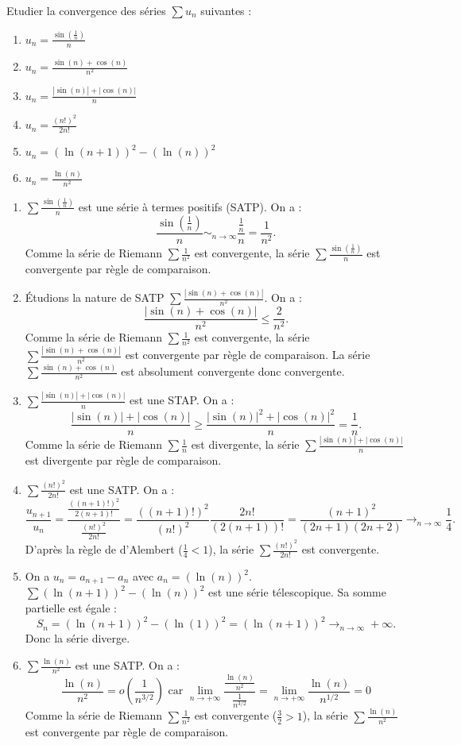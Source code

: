 \documentclass{book}
\begin{document}
\begin{Exercice}[ Nature]
Etudier la convergence des séries $\sum u_n$ suivantes :
    \begin{enumerate}
        \item $u_n =\frac{\sin(\frac 1 n)}{n}$ 
        \item $u_n=\frac{\sin(n)+\cos(n)}{n^2}$
        \item $u_n=\frac{|\sin(n)|+|\cos(n)|}{n}$
        \item $u_n=\frac{(n!)^2}{2n!}$
        \item $u_n=(\ln(n+1))^2-(\ln(n))^2$
        \item $u_n=\frac{\ln(n)}{n^2}$
    \end{enumerate}
\begin{Correction}
    \begin{enumerate}
        \item $\sum \frac{\sin(\frac 1 n)}{n}$ est une série à termes positifs (SATP). On a :
$$\frac{\sin(\frac 1 n)}{n}\sim_{n\to\infty}\frac{\frac 1 n}{n}=\frac{1}{n^2}.$$
Comme la série de Riemann $\sum \frac{1}{n^2}$ est convergente, la série $\sum \frac{\sin(\frac 1 n)}{n}$ est convergente par règle de comparaison.
	   \item 	Étudions la nature de SATP $\sum \frac{|\sin(n)+\cos(n)|}{n^2}$. On a :
	   $$\frac{|\sin(n)+\cos(n)|}{n^2} \leq \frac{2}{n^2}.$$
	   Comme la série de Riemann $\sum \frac{1}{n^2}$ est convergente, la série $\sum \frac{|\sin(n)+\cos(n)|}{n^2}$ est convergente par règle de comparaison. La série 
	   $\sum \frac{\sin(n)+\cos(n)}{n^2}$ est absolument convergente donc convergente.
	   \item  $\sum\frac{|\sin(n)|+|\cos(n)|}{n}$ est une STAP. On a :
 	   $$\frac{|\sin(n)|+|\cos(n)|}{n} \geq \frac{|\sin(n)|^2+|\cos(n)|^2}{n}= \frac{1}{n}.$$
	   Comme la série de Riemann $\sum \frac{1}{n}$ est divergente, la série $\sum\frac{|\sin(n)|+|\cos(n)|}{n}$  est divergente par règle de comparaison.
	   \item 	$\sum\frac{(n!)^2}{2n!}$ est une SATP. On a :
 $$\frac{u_{n+1}}{u_n}=\frac{\frac{((n+1)!)^2}{2(n+1)!}}{\frac{(n!)^2}{2n!}}=\frac{((n+1)!)^2}{(n!)^2}\frac{2n!}{(2(n+1))!}=\frac{(n+1)^2}{(2n+1)(2n+2)}\to_{n\to\infty}\frac 1 4.$$	  
D'après la règle de d'Alembert ($\frac 1 4 <1$), la série $\sum\frac{(n!)^2}{2n!}$ est convergente.
	    \item  On a $u_n=a_{n+1}-a_n$  avec $a_n = (\ln(n))^2$. $\sum (\ln(n+1))^2-(\ln(n))^2$ est une série télescopique. Sa somme partielle est égale :
	    $$S_n =  (\ln(n+1))^2 - (\ln(1))^2=(\ln(n+1))^2\to_{n\to\infty} +\infty.$$
	    Donc la série diverge.
	    \item 	$\sum\frac{\ln(n)}{n^2}$ est une SATP. On a :
	    $$\frac{\ln(n)}{n^2}=o\left(\frac{1}{n^{3/2}}\right)\text{ car }\lim\limits_{n\to+\infty}\frac{\frac{\ln(n)}{n^2}}{\frac{1}{n^{3/2}}}=\lim\limits_{n\to+\infty}\frac{\ln(n)}{n^{1/2}}=0$$
	    Comme la série de Riemann $\sum \frac{1}{n^2}$ est convergente ($\frac{3}{2}>1$), la série $\sum\frac{\ln(n)}{n^2}$ est convergente par règle de comparaison.
    \end{enumerate}
\end{Correction}
\end{Exercice}
\end{document}
